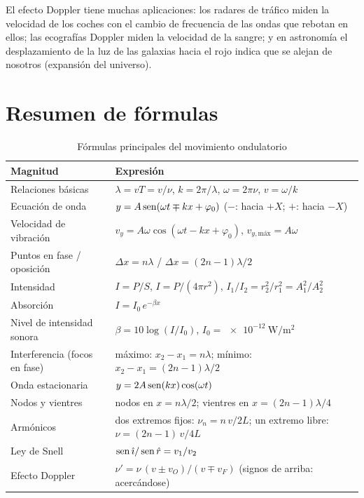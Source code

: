 \begin{remark}
    El efecto Doppler tiene muchas aplicaciones: los radares de tráfico miden la velocidad de los coches con el cambio de
    frecuencia de las ondas que rebotan en ellos; las ecografías Doppler miden la velocidad de la sangre; y en astronomía
    el desplazamiento de la luz de las galaxias hacia el rojo indica que se alejan de nosotros (expansión del universo).
\end{remark}

\section{Resumen de fórmulas}\label{sec:ond-resumen}

\begin{table}[H]
    \centering
    \caption{Fórmulas principales del movimiento ondulatorio}
    \vspace{-5pt}
    \begin{tabular}{@{}lL{10cm}@{}}
        \toprule
        \textbf{Magnitud} & \textbf{Expresión} \\
        \midrule
        Relaciones básicas & \(\lambda = vT = v/\nu\), \quad \(k = 2\pi/\lambda\), \quad \(\omega = 2\pi\nu\), \quad \(v = \omega/k\) \\[3pt]
        Ecuación de onda & \(y = A\operatorname{sen}(\omega t \mp kx + \varphi_0)\) \quad (\(-\): hacia \(+X\); \(+\): hacia \(-X\)) \\[3pt]
        Velocidad de vibración & \(v_y = A\omega\cos(\omega t - kx + \varphi_0)\), \quad \(v_{y,\text{máx}} = A\omega\) \\[3pt]
        Puntos en fase / oposición & \(\Delta x = n\lambda\) \quad / \quad \(\Delta x = (2n - 1)\lambda/2\) \\[3pt]
        Intensidad & \(I = P/S\), \quad \(I = P/(4\pi r^2)\), \quad \(I_1/I_2 = r_2^2/r_1^2 = A_1^2/A_2^2\) \\[3pt]
        Absorción & \(I = I_0\,e^{-\beta x}\) \\[3pt]
        Nivel de intensidad sonora & \(\beta = 10\log(I/I_0)\), \quad \(I_0 = \qty{e-12}{\watt\per\square\m}\) \\[3pt]
        Interferencia (focos en fase) & máximo: \(x_2 - x_1 = n\lambda\); \quad mínimo: \(x_2 - x_1 = (2n - 1)\lambda/2\) \\[3pt]
        Onda estacionaria & \(y = 2A\operatorname{sen}(kx)\cos(\omega t)\) \\[3pt]
        Nodos y vientres & nodos en \(x = n\lambda/2\); \quad vientres en \(x = (2n - 1)\lambda/4\) \\[3pt]
        Armónicos & dos extremos fijos: \(\nu_n = n\,v/2L\); \quad un extremo libre: \(\nu = (2n - 1)\,v/4L\) \\[3pt]
        Ley de Snell & \(\operatorname{sen}\hat{\imath}/\operatorname{sen}\hat r = v_1/v_2\) \\[3pt]
        Efecto Doppler & \(\nu' = \nu\,(v \pm v_O)/(v \mp v_F)\) \quad (signos de arriba: acercándose) \\
        \bottomrule
    \end{tabular}
    \label{tab:ond-resumen}
\end{table}


